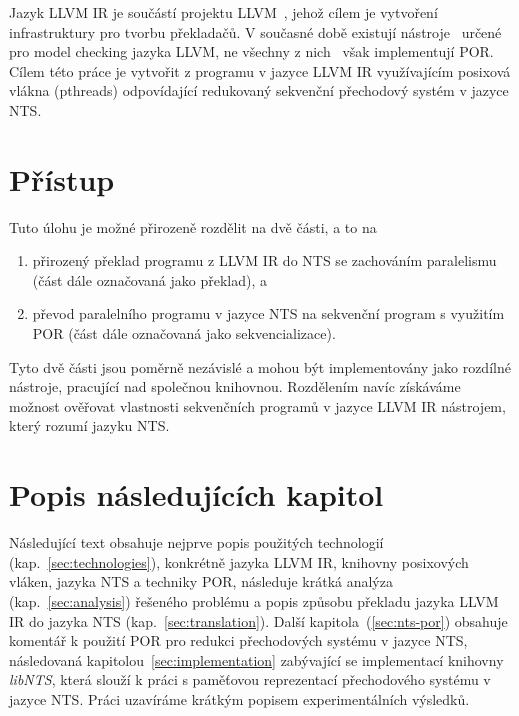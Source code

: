 \documentclass[12pt]{fithesis2}
\begin{document}
Jazyk LLVM IR je součástí projektu LLVM~\cite{LLVM}, jehož cílem je vytvoření infrastruktury pro tvorbu překladačů. V současné době existují nástroje~\cite{LLBMC} určené pro model checking jazyka LLVM, ne všechny z nich~\cite{BBH+13} však implementují POR. Cílem této práce je vytvořit z programu v jazyce LLVM IR využívajícím posixová vlákna (pthreads) odpovídající redukovaný sekvenční přechodový systém v jazyce NTS.

\section{Přístup}
Tuto úlohu je možné přirozeně rozdělit na dvě části, a to na
\begin{enumerate}
\item přirozený překlad programu z LLVM IR do NTS se zachováním paralelismu (část dále označovaná jako překlad), a
\item převod paralelního programu v jazyce NTS na sekvenční program s využitím POR (část dále označovaná jako sekvencializace).
\end{enumerate}
Tyto dvě části jsou poměrně nezávislé a mohou být implementovány jako rozdílné nástroje, pracující nad společnou knihovnou. Rozdělením navíc získáváme možnost ověřovat vlastnosti sekvenčních programů v jazyce LLVM IR nástrojem, který rozumí jazyku NTS.



\section{Popis následujících kapitol}
Následující text obsahuje nejprve popis použitých technologií (kap.~\ref{sec:technologies}), konkrétně jazyka LLVM IR, knihovny posixových vláken, jazyka NTS a techniky POR, následuje krátká analýza (kap.~\ref{sec:analysis}) řešeného problému a popis způsobu překladu jazyka LLVM IR do jazyka NTS (kap.~\ref{sec:translation}). Další kapitola~(\ref{sec:nts-por}) obsahuje komentář k použití POR pro redukci přechodových systému v jazyce NTS, následovaná kapitolou~\ref{sec:implementation} zabývající se implementací knihovny \textit{libNTS}, která slouží k práci s paměťovou reprezentací přechodového systému v jazyce NTS. Práci uzavíráme krátkým popisem experimentálních výsledků.


\end{document}
